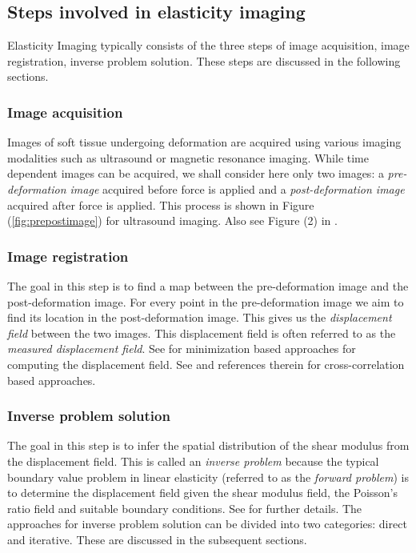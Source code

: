 \documentclass[12pt]{article}
\begin{document}
\subsection{Steps involved in elasticity imaging}
Elasticity Imaging typically consists of the three steps of image acquisition, image registration, inverse problem solution. These steps are discussed in the following sections.
\subsubsection{Image acquisition} Images of soft tissue undergoing deformation are acquired using various imaging modalities such as ultrasound or magnetic resonance imaging. While time dependent images can be acquired, we shall consider here only two images: a \textit{pre-deformation image} acquired before force is applied and a \textit{post-deformation image} acquired after force is applied. This process is shown in Figure (\ref{fig:prepostimage}) for ultrasound imaging. Also see Figure (2) in \cite{paper:konofagou2004}.
\subsubsection{Image registration} The goal in this step is to find a map between the pre-deformation image and the post-deformation image. For every point in the pre-deformation image we aim to find its location in the post-deformation image. This gives us the \textit{displacement field} between the two images. This displacement field is often referred to as the \textit{measured displacement field}. See \cite{paper:richards2009,paper:gokhale2004,paper:pellot-barakat2004} for minimization based approaches for computing the displacement field. See \cite{paper:ophir1991,paper:ophir1996,paper:alam1998} and references therein for cross-correlation based approaches.
\subsubsection{Inverse problem solution} The goal in this step is to infer the spatial distribution of the shear modulus from the displacement field. This is called an \textit{inverse problem} because the typical boundary value problem in linear elasticity (referred to as the \textit{forward problem}) is to determine the displacement field given the shear modulus field, the Poisson's ratio field and suitable boundary conditions. See \cite{book:hugheslinear} for further details. The approaches for inverse problem solution can be divided into two categories: direct and iterative. These are discussed in the subsequent sections.
\end{document}
